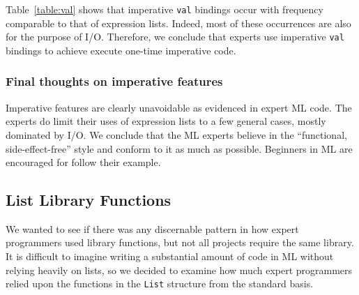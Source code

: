 \documentclass[12pt,abstracton]{scrartcl}
\begin{document}
Table~\ref{table:val} shows that imperative \texttt{val} bindings
occur with frequency comparable to that of expression lists.
Indeed, most of these occurrences are also for the purpose of I/O.
Therefore, we conclude that experts use imperative \texttt{val} bindings
to achieve execute one-time imperative code.
\subsubsection{Final thoughts on imperative features}
Imperative features are clearly unavoidable as evidenced in expert ML code. The experts do
limit their uses of expression lists to a few general cases, mostly dominated by I/O.
We conclude that the ML experts believe in the ``functional, side-effect-free'' style
and conform to it as much as possible. Beginners in ML are encouraged for follow their example.
\subsection{List Library Functions}\label{subsec:list}
We wanted to see if there was any discernable pattern in how expert programmers
used library functions, but not all projects require the same library.
It is difficult to imagine writing a substantial amount of code in ML without
relying heavily on lists, so we decided to examine how much expert programmers relied upon the functions
in the \texttt{List} structure from the standard basis.
\end{document}
